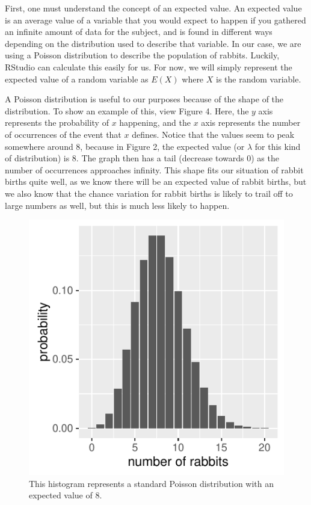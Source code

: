 \documentclass[titlepage]{article}\usepackage[]{graphicx}\usepackage[]{color}
\makeatletter
\def\maxwidth{ %
  \ifdim\Gin@nat@width>\linewidth
    \linewidth
  \else
    \Gin@nat@width
  \fi
}
\newenvironment{knitrout}{}{} %
\makeatother
\begin{document}
First, one must understand the concept of an expected value. An expected value is an average value of a variable that you would expect to happen if you gathered an infinite amount of data for the subject, and is found in different ways depending on the distribution used to describe that variable. In our case, we are using a Poisson distribution to describe the population of rabbits. Luckily, RStudio can calculate this easily for us. For now, we will simply represent the expected value of a random variable as \(E(X)\) where \(X\) is the random variable. 

A Poisson distribution is useful to our purposes because of the shape of the distribution. To show an example of this, view Figure 4. Here, the \(y\) axis represents the probability of \(x\) happening, and the \(x\) axis represents the number of occurrences of the event that \(x\) defines. Notice that the values seem to peak somewhere around 8, because in Figure 2, the expected value (or \(\lambda\) for this kind of distribution) is 8. The graph then has a tail (decrease towards 0) as the number of occurrences approaches infinity. This shape fits our situation of rabbit births quite well, as we know there will be an expected value of rabbit births, but we also know that the chance variation for rabbit births is likely to trail off to large numbers as well, but this is much less likely to happen. 

\begin{figure}
\begin{knitrout}
\color{fgcolor}

{\centering \includegraphics[width=\maxwidth]{figure/unnamed-chunk-5-1} 

}



\end{knitrout}
\caption{This histogram represents a standard Poisson distribution with an expected value of 8.}
\end{figure}
\end{document}
